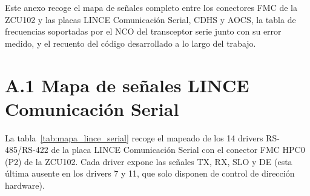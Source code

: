 Este anexo recoge el mapa de señales completo entre los conectores FMC de la ZCU102 y las
placas LINCE Comunicación Serial, CDHS y AOCS, la tabla de frecuencias soportadas
por el NCO del transceptor serie junto con su error medido, y el recuento del código desarrollado
a lo largo del trabajo.

\section*{A.1 Mapa de señales LINCE Comunicación Serial}

La tabla~\ref{tab:mapa_lince_serial} recoge el mapeado de los 14 drivers RS-485/RS-422 de la placa
LINCE Comunicación Serial con el conector FMC HPC0 (P2) de la ZCU102. Cada driver expone las
señales TX, RX, SLO y DE (esta última ausente en los drivers 7 y 11, que solo disponen de
control de dirección hardware).

